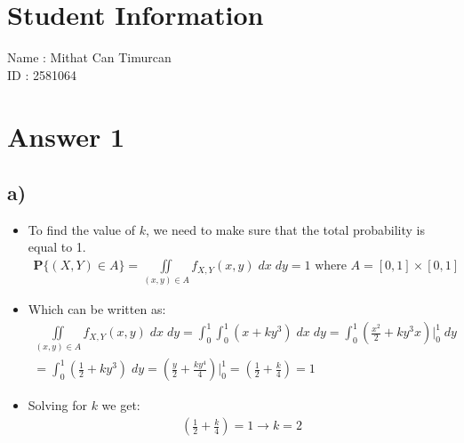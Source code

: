 \documentclass[12pt]{article}
\begin{document}
\section*{Student Information}

Name : Mithat Can Timurcan  \\

ID : 2581064


\section*{Answer 1}
\subsection*{a)}
\begin{itemize}
    \item To find the value of $k$, we need to make sure that the total probability is equal to 1.
    \begin{equation*}
        \begin{split}
            \textbf{P}\{(X,Y) \in A\} = \iint\limits_{(x,y) \in A} f_{X,Y}(x,y)\;dx\;dy = 1 \text{ where } A = [0,1] \times [0,1]
        \end{split}
     \end{equation*}
     \item Which can be written as:
     \begin{equation*}
        \begin{split}
            \iint\limits_{(x,y) \in A} f_{X,Y}(x,y)\;dx\;dy = \int_0^1\int_0^1(x + ky^3)\;dx\;dy = \int_0^1 \left(\frac{x^2}{2} + ky^3x  \right)\Big|_0^1\;dy \\
            = \int_0^1 \left(\frac{1}{2} + ky^3\right)\;dy = \left(\frac{y}{2} + \frac{ky^4}{4}\right) \Big|_0^1 = \left(\frac{1}{2} + \frac{k}{4}\right) = 1
        \end{split}
     \end{equation*}
     \item Solving for $k$ we get:
     \begin{equation*}
        \begin{split}
            \left(\frac{1}{2} + \frac{k}{4}\right) = 1 \rightarrow k = 2
        \end{split}
     \end{equation*}
\end{itemize} 
\end{document}
